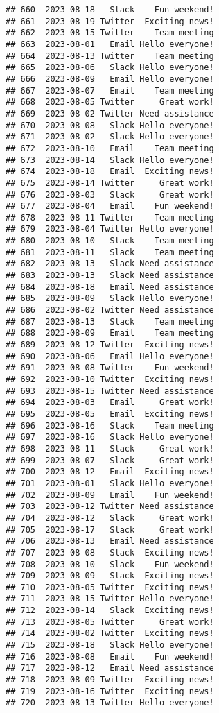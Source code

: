 \documentclass[
]{article}
\begin{document}
\begin{verbatim}
## 660  2023-08-18   Slack    Fun weekend!
## 661  2023-08-19 Twitter  Exciting news!
## 662  2023-08-15 Twitter    Team meeting
## 663  2023-08-01   Email Hello everyone!
## 664  2023-08-13 Twitter    Team meeting
## 665  2023-08-06   Slack Hello everyone!
## 666  2023-08-09   Email Hello everyone!
## 667  2023-08-07   Email    Team meeting
## 668  2023-08-05 Twitter     Great work!
## 669  2023-08-02 Twitter Need assistance
## 670  2023-08-08   Slack Hello everyone!
## 671  2023-08-02   Slack Hello everyone!
## 672  2023-08-10   Email    Team meeting
## 673  2023-08-14   Slack Hello everyone!
## 674  2023-08-18   Email  Exciting news!
## 675  2023-08-14 Twitter     Great work!
## 676  2023-08-03   Slack     Great work!
## 677  2023-08-04   Email    Fun weekend!
## 678  2023-08-11 Twitter    Team meeting
## 679  2023-08-04 Twitter Hello everyone!
## 680  2023-08-10   Slack    Team meeting
## 681  2023-08-11   Slack    Team meeting
## 682  2023-08-13   Slack Need assistance
## 683  2023-08-13   Slack Need assistance
## 684  2023-08-18   Email Need assistance
## 685  2023-08-09   Slack Hello everyone!
## 686  2023-08-02 Twitter Need assistance
## 687  2023-08-13   Slack    Team meeting
## 688  2023-08-09   Email    Team meeting
## 689  2023-08-12 Twitter  Exciting news!
## 690  2023-08-06   Email Hello everyone!
## 691  2023-08-08 Twitter    Fun weekend!
## 692  2023-08-10 Twitter  Exciting news!
## 693  2023-08-15 Twitter Need assistance
## 694  2023-08-03   Email     Great work!
## 695  2023-08-05   Email  Exciting news!
## 696  2023-08-16   Slack    Team meeting
## 697  2023-08-16   Slack Hello everyone!
## 698  2023-08-11   Slack     Great work!
## 699  2023-08-07   Slack     Great work!
## 700  2023-08-12   Email  Exciting news!
## 701  2023-08-01   Slack Hello everyone!
## 702  2023-08-09   Email    Fun weekend!
## 703  2023-08-12 Twitter Need assistance
## 704  2023-08-12   Slack     Great work!
## 705  2023-08-17   Slack     Great work!
## 706  2023-08-13   Email Need assistance
## 707  2023-08-08   Slack  Exciting news!
## 708  2023-08-10   Slack    Fun weekend!
## 709  2023-08-09   Slack  Exciting news!
## 710  2023-08-05 Twitter  Exciting news!
## 711  2023-08-15 Twitter Hello everyone!
## 712  2023-08-14   Slack  Exciting news!
## 713  2023-08-05 Twitter     Great work!
## 714  2023-08-02 Twitter  Exciting news!
## 715  2023-08-18   Slack Hello everyone!
## 716  2023-08-08   Email    Fun weekend!
## 717  2023-08-12   Email Need assistance
## 718  2023-08-09 Twitter  Exciting news!
## 719  2023-08-16 Twitter  Exciting news!
## 720  2023-08-13 Twitter Hello everyone!

\end{verbatim}
\end{document}
